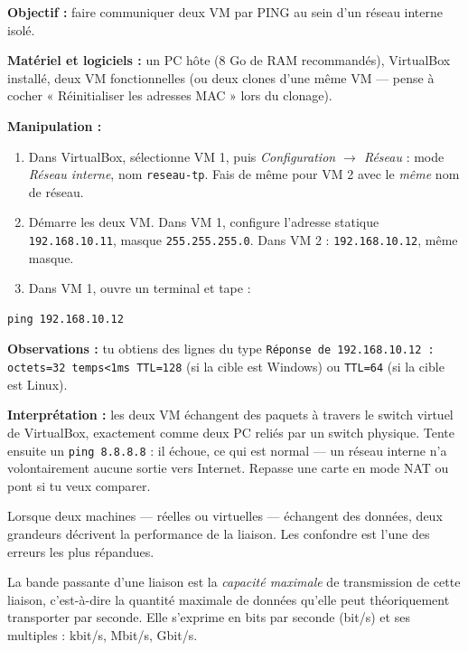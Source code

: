 \documentclass[11pt]{article}
\newcommand{\cle}[1]{{\popxbold\color{popdark}#1}}
\newcounter{popsec}
\newcounter{popsub}
\newcommand{\courssub}[1]{%
  \stepcounter{popsub}%
  \par\vspace{9pt}\noindent{\popxbold\fontsize{11.5}{13}\selectfont\color{popink}{\color{poporange}\thepopsec.\thepopsub}\hspace{6pt}#1}\par\nopagebreak\vspace{4pt}
}
\begin{document}
\begin{experience}
\textbf{Objectif :} faire communiquer deux VM par PING au sein d'un réseau interne isolé.

\textbf{Matériel et logiciels :} un PC hôte (8 Go de RAM recommandés), VirtualBox installé, deux VM fonctionnelles (ou deux clones d'une même VM — pense à cocher « Réinitialiser les adresses MAC » lors du clonage).

\textbf{Manipulation :}
\begin{enumerate}
\item Dans VirtualBox, sélectionne VM 1, puis \emph{Configuration $\rightarrow$ Réseau} : mode \emph{Réseau interne}, nom \texttt{reseau-tp}. Fais de même pour VM 2 avec le \emph{même} nom de réseau.
\item Démarre les deux VM. Dans VM 1, configure l'adresse statique \texttt{192.168.10.11}, masque \texttt{255.255.255.0}. Dans VM 2 : \texttt{192.168.10.12}, même masque.
\item Dans VM 1, ouvre un terminal et tape :
\end{enumerate}
\begin{lstlisting}
ping 192.168.10.12
\end{lstlisting}
\textbf{Observations :} tu obtiens des lignes du type \texttt{Réponse de 192.168.10.12 : octets=32 temps<1ms TTL=128} (si la cible est Windows) ou \texttt{TTL=64} (si la cible est Linux).

\textbf{Interprétation :} les deux VM échangent des paquets à travers le switch virtuel de VirtualBox, exactement comme deux PC reliés par un switch physique. Tente ensuite un \texttt{ping 8.8.8.8} : il échoue, ce qui est normal — un réseau interne n'a volontairement aucune sortie vers Internet. Repasse une carte en mode NAT ou pont si tu veux comparer.
\end{experience}

\courssub{Débit et bande passante}

Lorsque deux machines — réelles ou virtuelles — échangent des données, deux grandeurs décrivent la performance de la liaison. Les confondre est l'une des erreurs les plus répandues.

\begin{definition}
La \cle{bande passante} d'une liaison est la \emph{capacité maximale} de transmission de cette liaison, c'est-à-dire la quantité maximale de données qu'elle peut théoriquement transporter par seconde. Elle s'exprime en bits par seconde (bit/s) et ses multiples : kbit/s, Mbit/s, Gbit/s.
\end{definition}
\end{document}
